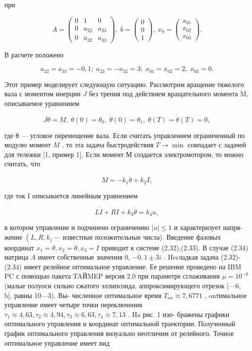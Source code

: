 \documentclass[10pt]{article}
\begin{document}
при

\[
A = \left( \begin{array}{ccc} 0 & 1 & 0 \\  0 & {a}_{22} & {a}_{23} \\  0 & {a}_{32} & {a}_{33} \end{array}\right) ,\;b = \left( \begin{array}{l} 0 \\  0 \\  1 \end{array}\right) ,\;{x}_{0} = \left( \begin{array}{l} {x}_{01} \\  {x}_{02} \\  {x}_{03} \end{array}\right) . \tag{2.33}
\]

В расчете положено

\[
{a}_{22} = {a}_{33} =  - 0,1;\;{a}_{23} =  - {a}_{32} = 3;\;{x}_{01} = {x}_{02} = 2,\;{x}_{03} = 0. \tag{2.34}
\]

Этот пример моделирует следующую ситуацию. Рассмотрим вращение тяжелого вала с моментом инерции \(J\) без трения под действием вращательного момента M, описываемое уравнением

\[
J\ddot{\theta } = M,\;\theta \left( 0\right)  = {\theta }_{0},\;\dot{\theta }\left( 0\right)  = {\theta }_{1},\;\theta \left( T\right)  = \dot{\theta }\left( T\right)  = 0,
\]

где θ — угловое перемещение вала. Если считать управлением ограниченный по модулю момент \(M\) , то эта задача быстродействия \(T \rightarrow  \min\) совпадает с задачей для тележки [1, пример 1]. Если момент М создается электромотором, то можно считать, что

\[
M =  - {k}_{1}\dot{\theta } + {k}_{2}I,
\]

где ток I описывается линейным уравнением

\[
L\dot{I} + {RI} + {k}_{3}\dot{\theta } = {k}_{4}u,
\]

в котором управление и подчинено ограничению \(\left| u\right|  \leq  1\) и характеризует напря- жение \(\left( {L,R,{k}_{j} - }\right.\) известные положительные числа). Введение фазовых координат \({x}_{1} = \theta ,{x}_{2} = \dot{\theta },{x}_{3} = I\) приводит к системе (2.32),(2.33). В случае (2.34) матрица \(A\) имеет собственные значения 0, \(- 0,1 \pm  {3i}\) . Herладкая задача (2.32)-(2.34) имеет релейное оптимальное управление. Ее решение проведено на IBM PC с помощью пакета TAЙMEP версия 2.0 при параметре сглаживания \(\mu  = {10}^{-6}\) (малые полуоси сильно сжатого эллипсоида, аппроксимирующего отрезок [—6, b], равны 10—3). Вы- численное оптимальное время \({T}_{on} \approx  7,{6771}\) , onтимальное управление имеет четыре точки переключения \({\tau }_{1} \approx  4,{63},{\tau }_{2} \approx  4,{94},{\tau }_{3} \approx  6,{63},{\tau }_{4} \approx  7,{13}\) . Ha рис. 1 изо- бражены графики оптимального управления и координат оптимальной траектории. Полученный график оптимального управления визуально неотличим от релейного. Точное оптимальное управление имеет вид
\end{document}
